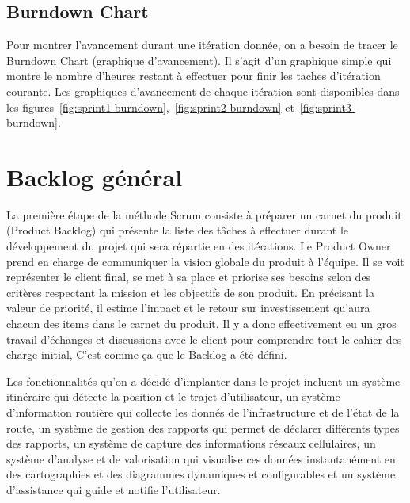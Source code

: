 
\subsection{Burndown Chart}

Pour montrer l'avancement durant une itération donnée, on a besoin de tracer le
Burndown Chart (graphique d'avancement). Il s'agit d'un graphique simple qui
montre le nombre d'heures restant à effectuer pour finir les taches d'itération
courante. Les graphiques d'avancement de chaque itération sont disponibles dans
les figures~\ref{fig:sprint1-burndown},~\ref{fig:sprint2-burndown}
et~\ref{fig:sprint3-burndown}.

\section{Backlog général}

La première étape de la méthode Scrum consiste à préparer un carnet du produit
(Product Backlog) qui présente la liste des tâches à effectuer durant le
développement du projet qui sera répartie en des itérations. Le Product Owner
prend en charge de communiquer la vision globale du produit à l'équipe. Il se
voit représenter le client final, se met à sa place et priorise ses besoins
selon des critères respectant la mission et les objectifs de son produit. En
précisant la valeur de priorité, il estime l'impact et le retour sur
investissement qu'aura chacun des items dans le carnet du produit. Il y a donc
effectivement eu un gros travail d'échanges et discussions avec le client pour
comprendre tout le cahier des charge initial, C'est comme ça que le Backlog a
été défini.

Les fonctionnalités qu'on a décidé d'implanter dans le projet  incluent un système itinéraire qui détecte la position et le trajet
d'utilisateur, un système d'information routière qui collecte les donnés de
l'infrastructure et de l'état de la route, un système de gestion des rapports
qui permet de déclarer différents types des rapports, un système de capture des
informations réseaux cellulaires, un système d'analyse et de valorisation qui
visualise ces données instantanément en des cartographies et des diagrammes
dynamiques et configurables et un système d'assistance qui guide et notifie
l'utilisateur.


